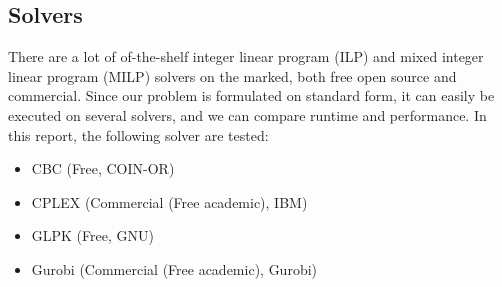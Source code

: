 \subsection{Solvers}
There are a lot of of-the-shelf integer linear program (ILP) and mixed integer linear program (MILP) solvers on the marked, both free open source and commercial. Since our problem is formulated on standard form, it can easily be executed on several solvers, and we can compare runtime and performance. In this report, the following solver are tested:
\begin{itemize}
\item CBC 		(Free, COIN-OR)
\item CPLEX 	(Commercial (Free academic),  IBM)
\item GLPK 		(Free, GNU)
\item Gurobi 	(Commercial (Free academic), Gurobi)
\end{itemize}

















